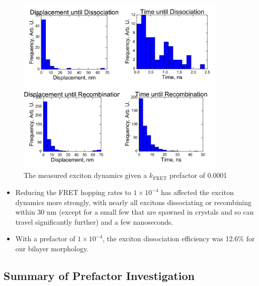 \documentclass[12pt]{article}
\begin{document}
\begin{figure}[h!]\centering
	\includegraphics[width=0.9\textwidth]{Figures/prefactor0001/prefactor0001.pdf}
    \caption{The measured exciton dynamics given a $k_{\text{FRET}}$ prefactor of 0.0001}
	\label{fig:noPrefactor}
\end{figure}

\begin{itemize}
    \item{Reducing the FRET hopping rates to $1 \times 10^{-4}$ has affected the exciton dynamics more strongly, with nearly all excitons dissociating or recombining within 30 nm (except for a small few that are spawned in crystals and so can travel significantly further) and a few nanoseconds.}
    \item{With a prefactor of $1 \times 10^{-4}$, the exciton dissociation efficiency was 12.6\% for our bilayer morphology.}
\end{itemize}

\clearpage

\subsection{Summary of Prefactor Investigation}
\end{document}

